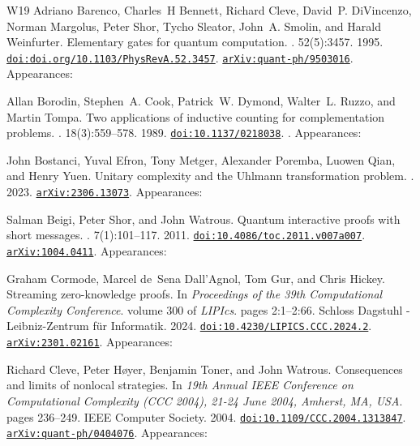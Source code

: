 \documentclass[10pt,a4paper]{article}
\numberwithin{equation}{section}
\numberwithin{figure}{section}
\begin{document}
\begin{thebibliography}{{}W19}
Adriano Barenco, Charles~H Bennett, Richard Cleve, David~P. DiVincenzo, Norman Margolus, Peter Shor, Tycho Sleator, John~A. Smolin, and Harald Weinfurter.
\newblock Elementary gates for quantum computation.
. 52(5):3457. 1995.
\newblock \href {https://doi.org/doi.org/10.1103/PhysRevA.52.3457} {\texttt{doi:doi.org/10.1103/PhysRevA.52.3457}}. \href {https://arxiv.org/abs/quant-ph/9503016} {\texttt{arXiv:quant-ph/9503016}}. Appearances:\!

Allan Borodin, Stephen~A. Cook, Patrick~W. Dymond, Walter~L. Ruzzo, and Martin Tompa.
\newblock Two applications of inductive counting for complementation problems.
. 18(3):559--578. 1989.
\newblock \href {https://doi.org/10.1137/0218038} {\texttt{doi:10.1137/0218038}}. . Appearances:\!

John Bostanci, Yuval Efron, Tony Metger, Alexander Poremba, Luowen Qian, and Henry Yuen.
\newblock Unitary complexity and the {Uhlmann} transformation problem.
. 2023.
\newblock \href {https://arxiv.org/abs/2306.13073} {\texttt{arXiv:2306.13073}}. Appearances:\!

Salman Beigi, Peter Shor, and John Watrous.
\newblock Quantum interactive proofs with short messages.
. 7(1):101--117. 2011.
\newblock \href {https://doi.org/10.4086/toc.2011.v007a007} {\texttt{doi:10.4086/toc.2011.v007a007}}. \href {https://arxiv.org/abs/1004.0411} {\texttt{arXiv:1004.0411}}. Appearances:\!

Graham Cormode, Marcel de~Sena Dall'Agnol, Tom Gur, and Chris Hickey.
\newblock Streaming zero-knowledge proofs.
\newblock In {\em Proceedings of the 39th Computational Complexity Conference}. volume 300 of {\em LIPIcs}. pages 2:1--2:66. Schloss Dagstuhl - Leibniz-Zentrum f{\"{u}}r Informatik. 2024.
\newblock \href {https://doi.org/10.4230/LIPICS.CCC.2024.2} {\texttt{doi:10.4230/LIPICS.CCC.2024.2}}. \href {https://arxiv.org/abs/2301.02161} {\texttt{arXiv:2301.02161}}. Appearances:\!

Richard Cleve, Peter H{\o}yer, Benjamin Toner, and John Watrous.
\newblock Consequences and limits of nonlocal strategies.
\newblock In {\em 19th Annual {IEEE} Conference on Computational Complexity {(CCC} 2004), 21-24 June 2004, Amherst, MA, {USA}}. pages 236--249. {IEEE} Computer Society. 2004.
\newblock \href {https://doi.org/10.1109/CCC.2004.1313847} {\texttt{doi:10.1109/CCC.2004.1313847}}. \href {https://arxiv.org/abs/quant-ph/0404076} {\texttt{arXiv:quant-ph/0404076}}. Appearances:\!


\end{thebibliography}
\end{document}
